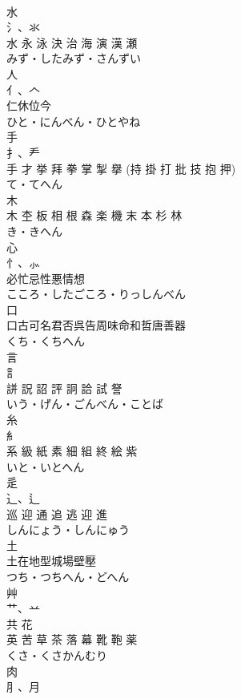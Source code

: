 \documentclass[8pt]{extreport}
\begin{document}
\begin{CJK}{UTF8}{min}
\\	水	
\\	氵、氺 
\\	水 永 泳 決 治 海 演 漢 瀬	
\\	みず・したみず・さんずい	
\\	人	
\\	亻、𠆢 
\\	仁休位今	
\\	ひと・にんべん・ひとやね	
\\	手	
\\	扌、龵 
\\	手 才 挙 拜 拳 掌 掣 擧 (持 掛 打 批 技 抱 押)	
\\	て・てへん	
\\	木	
\\	木 杢 板 相 根 森 楽 機 末 本 杉 林	
\\	き・きへん	
\\	心	
\\	忄、⺗ 
\\	必忙忌性悪情想	
\\	こころ・したごころ・りっしんべん	
\\	口	
\\	口古可名君否呉告周味命和哲唐善器	
\\	くち・くちへん	
\\	言	
\\	訁 
\\	誁 詋 詔 評 詗 詥 試 詧	
\\	いう・げん・ごんべん・ことば	
\\	糸	
\\	糹 
\\	系 級 紙 素 細 組 終 絵 紫	
\\	いと・いとへん	
\\	辵	
\\	⻌、辶 
\\	巡 迎 通 追 逃 迎 進	
\\	しんにょう・しんにゅう	
\\	土	
\\	土在地型城場壁壓	
\\	つち・つちへん・どへん	
\\	艸	
\\	艹、䒑 
\\	共 花
\\	英 苦 草 茶 落 幕 靴 鞄 薬	
\\	くさ・くさかんむり	
\\	肉	
\\	⺼、月 

\end{CJK}
\end{document}

